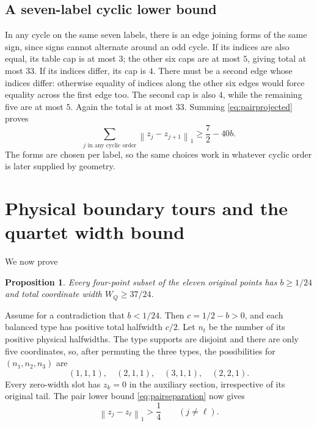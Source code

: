 \documentclass[11pt]{article}
\newtheorem{proposition}[theorem]{Proposition}
\theoremstyle{definition}
\theoremstyle{remark}
\newcommand{\norm}[1]{\left\lVert#1\right\rVert_1}
\begin{document}
\subsection{A seven-label cyclic lower bound}\label{subsec:cyclelower}

In any cycle on the same seven labels, there is an edge joining forms
of the same sign, since signs cannot alternate around an odd cycle.
If its indices are also equal, its table cap is at most $3$; the other
six caps are at most $5$, giving total at most $33$.
If its indices differ, its cap is $4$. There must be a second edge
whose indices differ: otherwise equality of indices along the other
six edges would force equality across the first edge too. The second
cap is also $4$, while the remaining five are at most $5$.
Again the total is at most $33$. Summing \eqref{eq:pairprojected} proves
\begin{equation}\label{eq:cyclelower}
 \sum_{j\text{ in any cyclic order}}\norm{z_j-z_{j+1}}
     \geq\frac72-40b.
\end{equation}
The forms are chosen per label, so the same choices work in whatever
cyclic order is later supplied by geometry.

\section{Physical boundary tours and the quartet width bound}\label{sec:perimeter}

We now prove
\begin{proposition}\label{prop:quartetbound}
Every four-point subset of the eleven original points has
$b\geq1/24$ and total coordinate width $W_Q\geq37/24$.
\end{proposition}

Assume for a contradiction that $b<1/24$. Then $c=1/2-b>0$, and
each balanced type has positive total halfwidth $c/2$. Let $n_t$ be
the number of its positive physical halfwidths. The type supports are
disjoint and there are only five coordinates, so, after permuting the
three types, the possibilities for $(n_1,n_2,n_3)$ are
\begin{equation}\label{eq:allocations}
 (1,1,1),\quad(2,1,1),\quad(3,1,1),\quad(2,2,1).
\end{equation}
Every zero-width slot has $z_k=0$ in the auxiliary section, irrespective
of its original tail. The pair lower bound \eqref{eq:pairseparation}
now gives
\begin{equation}\label{eq:quarterseparation}
 \norm{z_j-z_\ell}>\frac14\qquad(j\ne\ell).
\end{equation}
\end{document}

